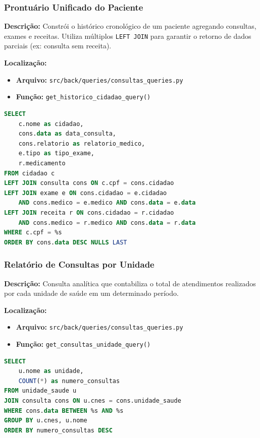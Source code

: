 \documentclass[12pt, a4paper]{article}
\begin{document}
\subsubsection{Prontuário Unificado do Paciente}
\textbf{Descrição:} Constrói o histórico cronológico de um paciente agregando consultas, exames e receitas. Utiliza múltiplos \texttt{LEFT JOIN} para garantir o retorno de dados parciais (ex: consulta sem receita).

\noindent\textbf{Localização:}
\begin{itemize}
    \item \textbf{Arquivo:} \texttt{src/back/queries/consultas\_queries.py}
    \item \textbf{Função:} \texttt{get\_historico\_cidadao\_query()}
\end{itemize}

\begin{lstlisting}[language=SQL, caption=Histórico Médico com Múltiplas Junções]
SELECT
    c.nome as cidadao,
    cons.data as data_consulta,
    cons.relatorio as relatorio_medico,
    e.tipo as tipo_exame,
    r.medicamento
FROM cidadao c
LEFT JOIN consulta cons ON c.cpf = cons.cidadao
LEFT JOIN exame e ON cons.cidadao = e.cidadao 
    AND cons.medico = e.medico AND cons.data = e.data
LEFT JOIN receita r ON cons.cidadao = r.cidadao 
    AND cons.medico = r.medico AND cons.data = r.data
WHERE c.cpf = %s 
ORDER BY cons.data DESC NULLS LAST
\end{lstlisting}

\subsubsection{Relatório de Consultas por Unidade}
\textbf{Descrição:} Consulta analítica que contabiliza o total de atendimentos realizados por cada unidade de saúde em um determinado período.

\noindent\textbf{Localização:}
\begin{itemize}
    \item \textbf{Arquivo:} \texttt{src/back/queries/consultas\_queries.py}
    \item \textbf{Função:} \texttt{get\_consultas\_unidade\_query()}
\end{itemize}

\begin{lstlisting}[language=SQL, caption=Agregação: Total de consultas por Unidade]
SELECT 
    u.nome as unidade, 
    COUNT(*) as numero_consultas
FROM unidade_saude u
JOIN consulta cons ON u.cnes = cons.unidade_saude
WHERE cons.data BETWEEN %s AND %s
GROUP BY u.cnes, u.nome
ORDER BY numero_consultas DESC
\end{lstlisting}
\end{document}

